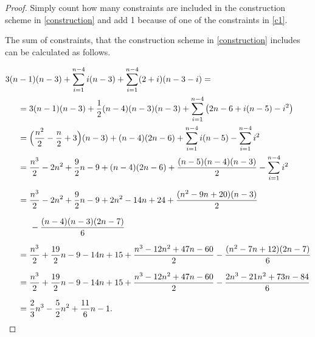 \begin{proof}
	Simply count how many constraints are included in the construction scheme in \ref{construction} and add 1 because of one of the constraints in \ref{c1}.
	
	The sum of constraints, that the construction scheme in \ref{construction} includes can be calculated as follows.
	
	\begin{align*}
	3(n&-1)(n-3) + \sum_{i=1}^{n-4}i(n-3) +\sum_{i=1}^{n-4}(2+i)(n-3-i) =\\
	&= 3(n-1)(n-3)+ \frac{1}{2}(n-4)(n-3)(n-3) +\sum_{i=1}^{n-4}\big(2n-6+i(n-5)-i^2\big) \\
	&= \Big(\frac{n^2}{2}-\frac{n}{2}+3\Big)(n-3) + (n-4)(2n-6) +\sum_{i=1}^{n-4}i(n-5)-\sum_{i=1}^{n-4}i^2 \\
	&= \frac{n^3}{2} -2n^2+\frac{9}{2}n -9 + (n-4)(2n-6) +\frac{(n-5)(n-4)(n-3)}{2}- \sum_{i=1}^{n-4}i^2 \\[7pt]
	&= \frac{n^3}{2} -2n^2+\frac{9}{2}n -9 + 2n^2-14n+24 +\frac{(n^2-9n+20)(n-3)}{2} \\[7pt]
	& \hspace*{0.5cm}-\frac{(n-4)(n-3)(2n-7)}{6} \\[7pt]
	&=\frac{n^3}{2}+\frac{19}{2}n-9-14n+15 +\frac{n^3-12n^2+47n-60}{2}-\frac{(n^2-7n+12)(2n-7)}{6} \\[7pt]
	&=\frac{n^3}{2}+\frac{19}{2}n-9-14n+15 +\frac{n^3-12n^2+47n-60}{2}-\frac{2n^3-21n^2+73n-84}{6} \\[7pt]
	&=\frac{2}{3}n^3-\frac{5}{2}n^2+\frac{11}{6}n-1.
	\end{align*} 
	
	

\end{proof}
